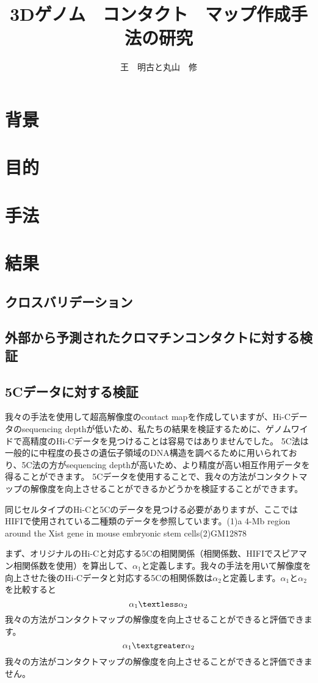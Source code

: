 \documentclass[uplatex,dvipdfmx]{jsarticle}
\begin{document}
\title{3Dゲノム　コンタクト　マップ作成手法の研究}
\author{王　明古と丸山　修}
\maketitle
\section{背景}
\section{目的}
\section{手法}
\section{結果}
\subsection{クロスバリデーション}
\subsection{外部から予測されたクロマチンコンタクトに対する検証}
\subsection{5Cデータに対する検証}

我々の手法を使用して超高解像度のcontact mapを作成していますが、Hi-Cデータのsequencing depthが低いため、私たちの結果を検証するために、ゲノムワイドで高精度のHi-Cデータを見つけることは容易ではありませんでした。 5C法は一般的に中程度の長さの遺伝子領域のDNA構造を調べるために用いられており、5C法の方がsequencing depthが高いため、より精度が高い相互作用データを得ることができます。 5Cデータを使用することで、我々の方法がコンタクトマップの解像度を向上させることができるかどうかを検証することができます。

同じセルタイプのHi-Cと5Cのデータを見つける必要がありますが、ここではHIFIで使用されている二種類のデータを参照しています。(1)a 4-Mb region around the Xist gene in mouse embryonic stem cells(2)GM12878

まず、オリジナルのHi-Cと対応する5Cの相関関係（相関係数、HIFIでスピアマン相関係数を使用）を算出して、$\alpha_1$と定義します。我々の手法を用いて解像度を向上させた後のHi-Cデータと対応する5Cの相関係数は$\alpha_2$と定義します。$\alpha_1$と$\alpha_2$を比較すると
$$\alpha_1 \textless \alpha_2$$
我々の方法がコンタクトマップの解像度を向上させることができると評価できます。
$$\alpha_1 \textgreater \alpha_2$$
我々の方法がコンタクトマップの解像度を向上させることができると評価できません。
\end{document}
